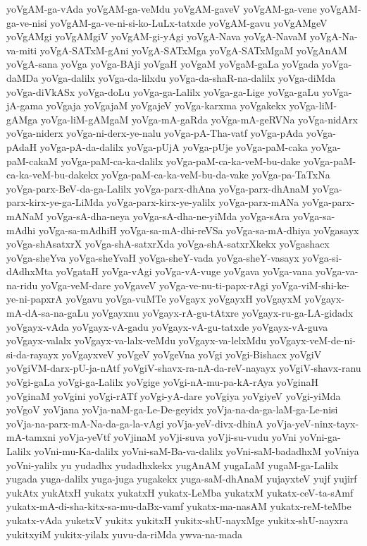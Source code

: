 {yoVgAM-ga-vAda
yoVgAM-ga-veMdu
yoVgAM-gaveV
yoVgAM-ga-vene
yoVgAM-ga-ve-nisi
yoVgAM-ga-ve-ni-si-ko-LuLx-tatxde
yoVgAM-gavu
yoVgAMgeV
yoVgAMgi
yoVgAMgiV
yoVgAM-gi-yAgi
yoVgA-Nava
yoVgA-NavaM
yoVgA-Na-va-miti
yoVgA-SATxM-gAni
yoVgA-SATxMga
yoVgA-SATxMgaM
yoVgAnAM
yoVgA-sana
yoVga
yoVga-BAji
yoVgaH
yoVgaM
yoVgaM-gaLa
yoVgada
yoVga-daMDa
yoVga-dalilx
yoVga-da-lilxdu
yoVga-da-shaR-na-dalilx
yoVga-diMda
yoVga-diVkASx
yoVga-doLu
yoVga-ga-Lalilx
yoVga-ga-Lige
yoVga-gaLu
yoVga-jA-gama
yoVgaja
yoVgajaM
yoVgajeV
yoVga-karxma
yoVgakekx
yoVga-liM-gAMga
yoVga-liM-gAMgaM
yoVga-mA-gaRda
yoVga-mA-geRVNa
yoVga-nidArx
yoVga-niderx
yoVga-ni-derx-ye-nalu
yoVga-pA-Tha-vatf
yoVga-pAda
yoVga-pAdaH
yoVga-pA-da-dalilx
yoVga-pUjA
yoVga-pUje
yoVga-paM-caka
yoVga-paM-cakaM
yoVga-paM-ca-ka-dalilx
yoVga-paM-ca-ka-veM-bu-dake
yoVga-paM-ca-ka-veM-bu-dakekx
yoVga-paM-ca-ka-veM-bu-da-vake
yoVga-pa-TaTxNa
yoVga-parx-BeV-da-ga-Lalilx
yoVga-parx-dhAna
yoVga-parx-dhAnaM
yoVga-parx-kirx-ye-ga-LiMda
yoVga-parx-kirx-ye-yalilx
yoVga-parx-mANa
yoVga-parx-mANaM
yoVga-sA-dha-neya
yoVga-sA-dha-ne-yiMda
yoVga-sAra
yoVga-sa-mAdhi
yoVga-sa-mAdhiH
yoVga-sa-mA-dhi-reVSa
yoVga-sa-mA-dhiya
yoVgasayx
yoVga-shAsatxrX
yoVga-shA-satxrXda
yoVga-shA-satxrXkekx
yoVgashacx
yoVga-sheYva
yoVga-sheYvaH
yoVga-sheY-vada
yoVga-sheY-vasayx
yoVga-si-dAdhxMta
yoVgataH
yoVga-vAgi
yoVga-vA-vuge
yoVgava
yoVga-vana
yoVga-va-na-ridu
yoVga-veM-dare
yoVgaveV
yoVga-ve-nu-ti-papx-rAgi
yoVga-viM-shi-ke-ye-ni-papxrA
yoVgavu
yoVga-vuMTe
yoVgayx
yoVgayxH
yoVgayxM
yoVgayx-mA-dA-sa-na-gaLu
yoVgayxnu
yoVgayx-rA-gu-tAtxre
yoVgayx-ru-ga-LA-gidadx
yoVgayx-vAda
yoVgayx-vA-gadu
yoVgayx-vA-gu-tatxde
yoVgayx-vA-guva
yoVgayx-valalx
yoVgayx-va-lalx-veMdu
yoVgayx-va-lelxMdu
yoVgayx-veM-de-ni-si-da-rayayx
yoVgayxveV
yoVgeV
yoVgeVna
yoVgi
yoVgi-Bishacx
yoVgiV
yoVgiVM-darx-pU-ja-nAtf
yoVgiV-shavx-ra-nA-da-reV-nayayx
yoVgiV-shavx-ranu
yoVgi-gaLa
yoVgi-ga-Lalilx
yoVgige
yoVgi-nA-mu-pa-kA-rAya
yoVginaH
yoVginaM
yoVgini
yoVgi-rATf
yoVgi-yA-dare
yoVgiya
yoVgiyeV
yoVgi-yiMda
yoVgoV
yoVjana
yoVja-naM-ga-Le-De-geyidx
yoVja-na-da-ga-laM-ga-Le-nisi
yoVja-na-parx-mA-Na-da-ga-la-vAgi
yoVja-yeV-divx-dhinA
yoVja-yeV-ninx-tayx-mA-tamxni
yoVja-yeVtf
yoVjinaM
yoVji-suva
yoVji-su-vudu
yoVni
yoVni-ga-Lalilx
yoVni-mu-Ka-dalilx
yoVni-saM-Ba-va-dalilx
yoVni-saM-badadhxM
yoVniya
yoVni-yalilx
yu
yudadhx
yudadhxkekx
yugAnAM
yugaLaM
yugaM-ga-Lalilx
yugada
yuga-dalilx
yuga-juga
yugakekx
yuga-saM-dhAnaM
yujayxteV
yujf
yujirf
yukAtx
yukAtxH
yukatx
yukatxH
yukatx-LeMba
yukatxM
yukatx-ceV-ta-sAmf
yukatx-mA-di-sha-kitx-sa-mu-daBx-vamf
yukatx-ma-nasAM
yukatx-reM-teMbe
yukatx-vAda
yuketxV
yukitx
yukitxH
yukitx-shU-nayxMge
yukitx-shU-nayxra
yukitxyiM
yukitx-yilalx
yuvu-da-riMda
ywva-na-mada
}
